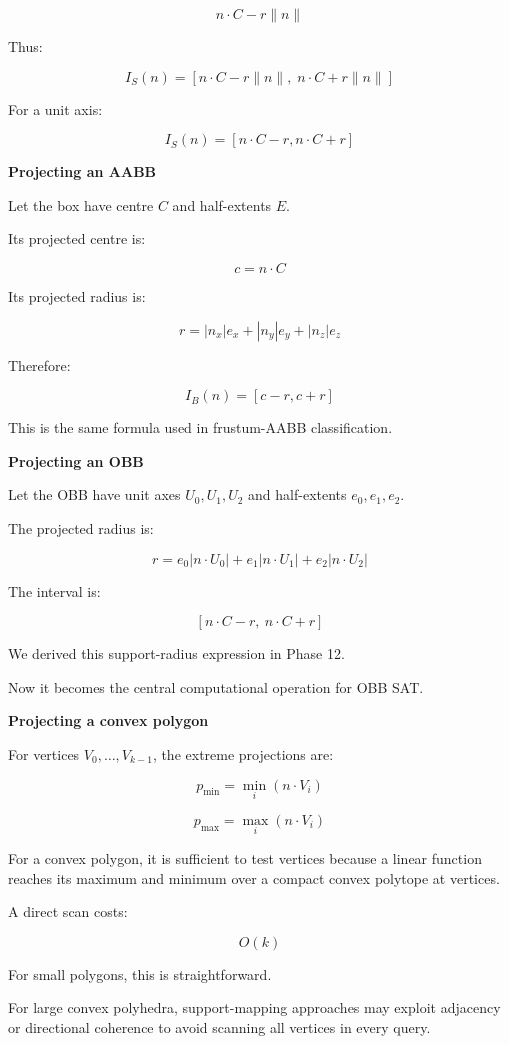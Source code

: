 \[
n\cdot C-r\|n\|
\]

Thus:

\[
\boxed{ I_S(n)= [n\cdot C-r\|n\|,\; n\cdot C+r\|n\|] }
\]

For a unit axis:

\[
I_S(n)=[n\cdot C-r,n\cdot C+r]
\]

\textbf{Projecting an AABB}

Let the box have centre \(C\) and half-extents \(E\).

Its projected centre is:

\[
c=n\cdot C
\]

Its projected radius is:

\[
\boxed{ r=|n_x|e_x+|n_y|e_y+|n_z|e_z }
\]

Therefore:

\[
\boxed{I_B(n)=[c-r,c+r]}
\]

This is the same formula used in frustum-AABB classification.

\textbf{Projecting an OBB}

Let the OBB have unit axes \(U_0,U_1,U_2\) and half-extents \(e_0,e_1,e_2\).

The projected radius is:

\[
\boxed{ r= e_0|n\cdot U_0| + e_1|n\cdot U_1| + e_2|n\cdot U_2| }
\]

The interval is:

\[
\boxed{ [n\cdot C-r,\ n\cdot C+r] }
\]

We derived this support-radius expression in Phase 12.

Now it becomes the central computational operation for OBB SAT.

\textbf{Projecting a convex polygon}

For vertices \(V_0,\ldots,V_{k-1}\), the extreme projections are:

\[
p_{\min}=\min_i(n\cdot V_i)
\]

\[
p_{\max}=\max_i(n\cdot V_i)
\]

For a convex polygon, it is sufficient to test vertices because a linear function reaches its maximum and minimum over a compact convex polytope at vertices.

A direct scan costs:

\[
O(k)
\]

For small polygons, this is straightforward.

For large convex polyhedra, support-mapping approaches may exploit adjacency or directional coherence to avoid scanning all vertices in every query.


